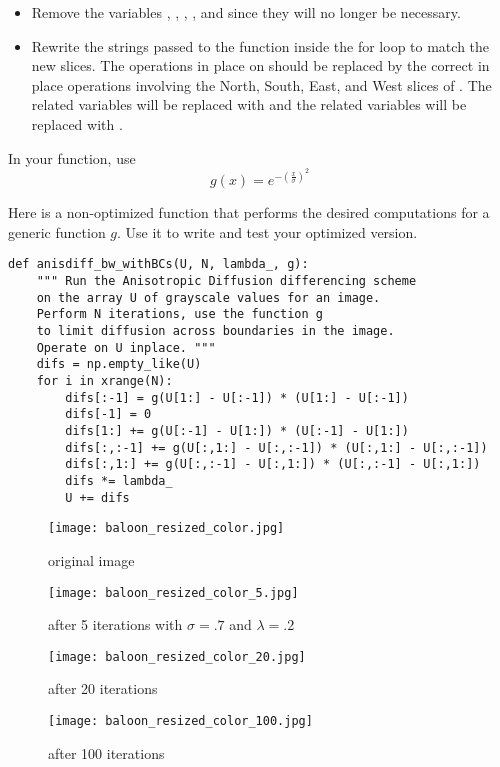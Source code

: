 \begin{problem}
\begin{itemize}
\item Remove the variables , , , , and  since they will no longer be necessary.

\item Rewrite the strings passed to the  function inside the for loop to match the new slices.
The operations in place on  should be replaced by the correct in place operations involving the North, South, East, and West slices of .
The  related variables will be replaced with  and the  related variables will be replaced with .

\end{itemize}

In your function, use
\[g(x) = e^{-\left(\frac{x}{\sigma}\right)^2}\]

Here is a non-optimized function that performs the desired computations for a generic function $g$.
Use it to write and test your optimized version.
\begin{lstlisting}
def anisdiff_bw_withBCs(U, N, lambda_, g):
    """ Run the Anisotropic Diffusion differencing scheme
    on the array U of grayscale values for an image.
    Perform N iterations, use the function g
    to limit diffusion across boundaries in the image.
    Operate on U inplace. """
    difs = np.empty_like(U)
    for i in xrange(N):
        difs[:-1] = g(U[1:] - U[:-1]) * (U[1:] - U[:-1])
        difs[-1] = 0
        difs[1:] += g(U[:-1] - U[1:]) * (U[:-1] - U[1:])
        difs[:,:-1] += g(U[:,1:] - U[:,:-1]) * (U[:,1:] - U[:,:-1])
        difs[:,1:] += g(U[:,:-1] - U[:,1:]) * (U[:,:-1] - U[:,1:])
        difs *= lambda_
        U += difs
\end{lstlisting}
\end{problem}

\newpage
\vfill
\begin{figure}[ht]
\begin{minipage}[b]{0.45\linewidth}
\centering
\texttt{[image: baloon\_resized\_color.jpg]}
\caption*{original image}
\end{minipage}
\hspace{0.5cm}
\begin{minipage}[b]{0.45\linewidth}
\centering
\texttt{[image: baloon\_resized\_color\_5.jpg]}
\caption*{after 5 iterations with $\sigma = .7$ and $\lambda = .2$}
\end{minipage}
\begin{minipage}[b]{0.45\linewidth}
\centering
\texttt{[image: baloon\_resized\_color\_20.jpg]}
\caption*{after 20 iterations}
\end{minipage}
\hspace{0.5cm}
\begin{minipage}[b]{0.45\linewidth}
\centering
\texttt{[image: baloon\_resized\_color\_100.jpg]}
\caption*{after 100 iterations}
\end{minipage}
\end{figure}
\vfill
\clearpage

